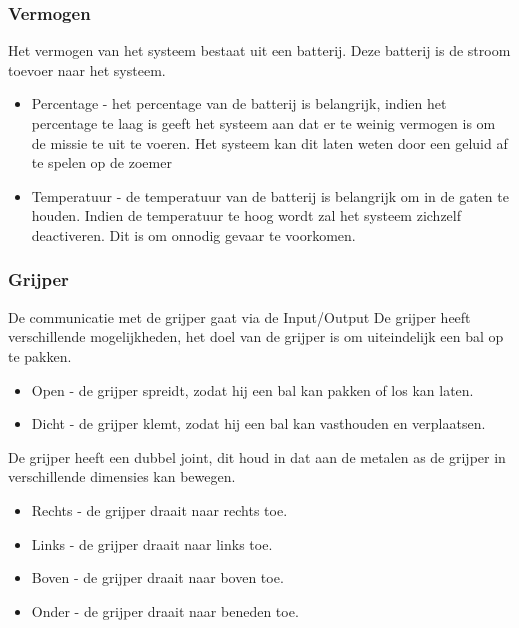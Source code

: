 \documentclass[12pt]{article} %
\begin{document}
\subsubsection{Vermogen}
Het vermogen van het systeem bestaat uit een batterij. Deze batterij is de stroom toevoer naar het systeem.
\begin{itemize}
\item Percentage - het percentage van de batterij is belangrijk, indien het percentage te laag is geeft het systeem aan dat er te weinig vermogen is om de missie te uit te voeren. Het systeem kan dit laten weten door een geluid af te spelen op de zoemer
\item Temperatuur - de temperatuur van de batterij is belangrijk om in de gaten te houden. Indien de temperatuur te hoog wordt zal het systeem zichzelf deactiveren. Dit is om onnodig gevaar te voorkomen.
\end{itemize}

\subsubsection{Grijper}
De communicatie met de grijper gaat via de Input/Output
De grijper heeft verschillende mogelijkheden, het doel van de grijper is om uiteindelijk een bal op te pakken.
\begin{itemize}
\item Open - de grijper spreidt, zodat hij een bal kan pakken of los kan laten.
\item Dicht - de grijper klemt, zodat hij een bal kan vasthouden en verplaatsen.
\end{itemize} 
De grijper heeft een dubbel joint, dit houd in dat aan de metalen as de grijper in verschillende dimensies kan bewegen.
\begin{itemize}
\item Rechts - de grijper draait naar rechts toe.
\item Links - de grijper draait naar links toe.
\item Boven - de grijper draait naar boven toe.
\item Onder - de grijper draait naar beneden toe.
\end{itemize}
\end{document}
